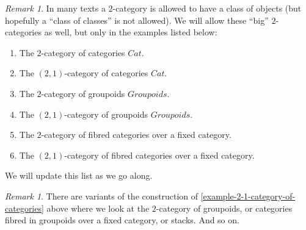 \documentclass{amsart}
\theoremstyle{definition}
\theoremstyle{remark}
\newtheorem{remark}[theorem]{Remark}
\numberwithin{equation}{subsection}
\begin{document}
\begin{remark} 
\label{remark-big-2-categories}
In many texts a $2$-category is allowed to have a class of
objects (but hopefully a ``class of classes'' is not allowed).
We will allow these ``big'' $2$-categories as well, but only
in the examples listed below:
\begin{enumerate}
\item The $2$-category of categories $\textit{Cat}$.
\item The $(2,1)$-category of categories $\textit{Cat}$.
\item The $2$-category of groupoids $\textit{Groupoids}$.
\item The $(2,1)$-category of groupoids $\textit{Groupoids}$.
\item The $2$-category of fibred categories over a fixed category.
\item The $(2,1)$-category of fibred categories over a fixed category.
\end{enumerate}
We will update this list as we go along.
\end{remark}

\begin{remark}
\label{remark-other-2-categories}
There are variants of the construction of
\ref{example-2-1-category-of-categories} above
where we look at the $2$-category of groupoids,
or categories fibred in groupoids over a fixed
category, or stacks. And so on.
\end{remark}
\end{document}
